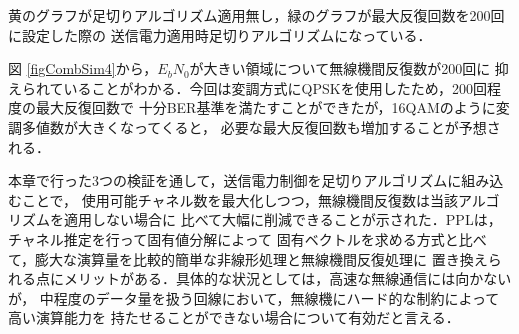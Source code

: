 黄のグラフが足切りアルゴリズム適用無し，緑のグラフが最大反復回数を200回に設定した際の
送信電力適用時足切りアルゴリズムになっている．

図 \ref{figCombSim4}から，$E_bN_0$が大きい領域について無線機間反復数が200回に
抑えられていることがわかる．今回は変調方式にQPSKを使用したため，200回程度の最大反復回数で
十分BER基準を満たすことができたが，16QAMのように変調多値数が大きくなってくると，
必要な最大反復回数も増加することが予想される．

本章で行った3つの検証を通して，送信電力制御を足切りアルゴリズムに組み込むことで，
使用可能チャネル数を最大化しつつ，無線機間反復数は当該アルゴリズムを適用しない場合に
比べて大幅に削減できることが示された．PPLは，チャネル推定を行って固有値分解によって
固有ベクトルを求める方式と比べて，膨大な演算量を比較的簡単な非線形処理と無線機間反復処理に
置き換えられる点にメリットがある．具体的な状況としては，高速な無線通信には向かないが，
中程度のデータ量を扱う回線において，無線機にハード的な制約によって高い演算能力を
持たせることができない場合について有効だと言える．